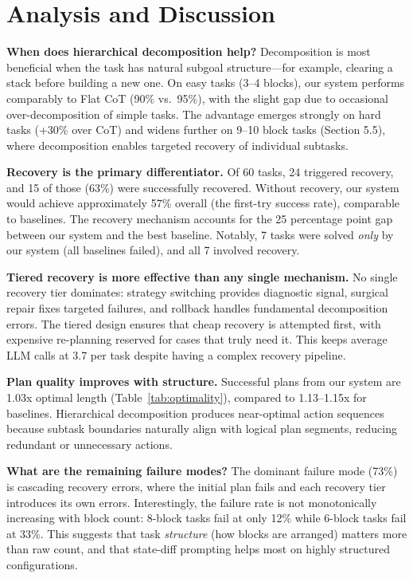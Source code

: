 \documentclass{article}
\begin{document}
\section{Analysis and Discussion}

\textbf{When does hierarchical decomposition help?} Decomposition is most beneficial when the task has natural subgoal structure---for example, clearing a stack before building a new one. On easy tasks (3--4 blocks), our system performs comparably to Flat CoT (90\% vs.\ 95\%), with the slight gap due to occasional over-decomposition of simple tasks. The advantage emerges strongly on hard tasks (+30\% over CoT) and widens further on 9--10 block tasks (Section 5.5), where decomposition enables targeted recovery of individual subtasks.

\textbf{Recovery is the primary differentiator.} Of 60 tasks, 24 triggered recovery, and 15 of those (63\%) were successfully recovered. Without recovery, our system would achieve approximately 57\% overall (the first-try success rate), comparable to baselines. The recovery mechanism accounts for the 25 percentage point gap between our system and the best baseline. Notably, 7 tasks were solved \textit{only} by our system (all baselines failed), and all 7 involved recovery.

\textbf{Tiered recovery is more effective than any single mechanism.} No single recovery tier dominates: strategy switching provides diagnostic signal, surgical repair fixes targeted failures, and rollback handles fundamental decomposition errors. The tiered design ensures that cheap recovery is attempted first, with expensive re-planning reserved for cases that truly need it. This keeps average LLM calls at 3.7 per task despite having a complex recovery pipeline.

\textbf{Plan quality improves with structure.} Successful plans from our system are 1.03x optimal length (Table~\ref{tab:optimality}), compared to 1.13--1.15x for baselines. Hierarchical decomposition produces near-optimal action sequences because subtask boundaries naturally align with logical plan segments, reducing redundant or unnecessary actions.

\textbf{What are the remaining failure modes?} The dominant failure mode (73\%) is cascading recovery errors, where the initial plan fails and each recovery tier introduces its own errors. Interestingly, the failure rate is not monotonically increasing with block count: 8-block tasks fail at only 12\% while 6-block tasks fail at 33\%. This suggests that task \textit{structure} (how blocks are arranged) matters more than raw count, and that state-diff prompting helps most on highly structured configurations.
\end{document}
